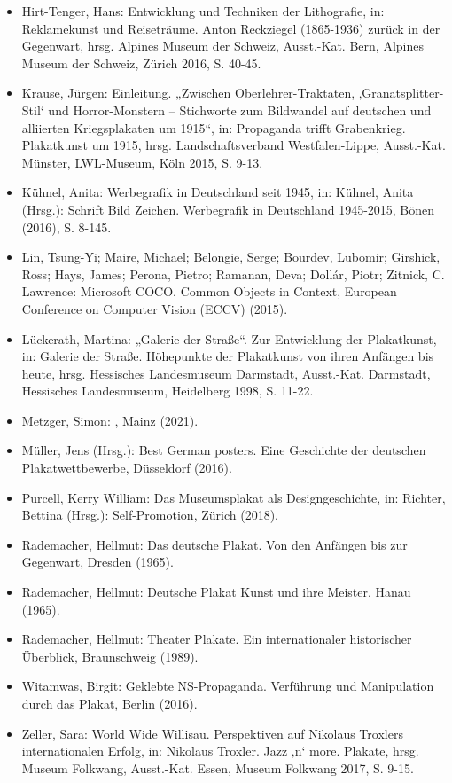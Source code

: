 \documentclass[a4paper,12pt,ngerman]{article}
\begin{document}
\begin{itemize}
\item Hirt-Tenger, Hans: Entwicklung und Techniken der Lithografie, in: Reklamekunst und Reiseträume. Anton Reckziegel (1865-1936) zurück in der Gegenwart, hrsg. Alpines Museum der Schweiz, Ausst.-Kat. Bern, Alpines Museum der Schweiz, Zürich 2016, S. 40-45.
\item Krause, Jürgen: Einleitung. „Zwischen Oberlehrer-Traktaten, ‚Granatsplitter-Stil‘ und Horror-Monstern – Stichworte zum Bildwandel auf deutschen und alliierten Kriegsplakaten um 1915“, in: Propaganda trifft Grabenkrieg. Plakatkunst um 1915, hrsg. Landschaftsverband Westfalen-Lippe, Ausst.-Kat. Münster, LWL-Museum, Köln 2015, S. 9-13.
\item Kühnel, Anita: Werbegrafik in Deutschland seit 1945, in: Kühnel, Anita (Hrsg.): Schrift Bild Zeichen. Werbegrafik in Deutschland 1945-2015, Bönen (2016), S. 8-145.
\item Lin, Tsung-Yi; Maire, Michael; Belongie, Serge; Bourdev, Lubomir; Girshick, Ross; Hays, James; Perona, Pietro; Ramanan, Deva; Dollár, Piotr; Zitnick, C. Lawrence: Microsoft COCO. Common Objects in Context, European Conference on Computer Vision (ECCV) (2015).
\item Lückerath, Martina: „Galerie der Straße“. Zur Entwicklung der Plakatkunst, in: Galerie der Straße. Höhepunkte der Plakatkunst von ihren Anfängen bis heute, hrsg. Hessisches Landesmuseum Darmstadt, Ausst.-Kat. Darmstadt, Hessisches Landesmuseum, Heidelberg 1998, S. 11-22.
\item Metzger, Simon: , Mainz (2021).
\item Müller, Jens (Hrsg.): Best German posters. Eine Geschichte der deutschen Plakatwettbewerbe, Düsseldorf (2016).
\item Purcell, Kerry William: Das Museumsplakat als Designgeschichte, in: Richter, Bettina (Hrsg.): Self-Promotion, Zürich (2018).
\item Rademacher, Hellmut: Das deutsche Plakat. Von den Anfängen bis zur Gegenwart, Dresden (1965).
\item Rademacher, Hellmut: Deutsche Plakat Kunst und ihre Meister, Hanau (1965).
\item Rademacher, Hellmut: Theater Plakate. Ein internationaler historischer Überblick, Braunschweig (1989).
\item Witamwas, Birgit: Geklebte NS-Propaganda. Verführung und Manipulation durch das Plakat, Berlin (2016).
\item Zeller, Sara: World Wide Willisau. Perspektiven auf Nikolaus Troxlers internationalen Erfolg, in: Nikolaus Troxler. Jazz ‚n‘ more. Plakate, hrsg. Museum Folkwang, Ausst.-Kat. Essen, Museum Folkwang 2017, S. 9-15.

\end{itemize}

\end{document}
